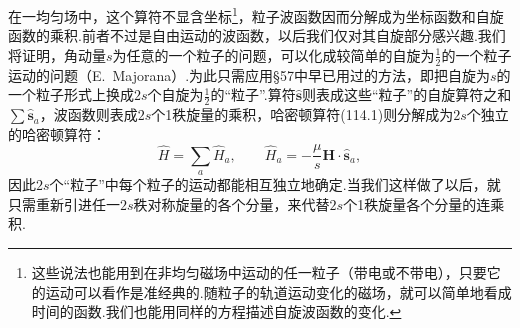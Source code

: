 在一均匀场中，这个算符不显含坐标\footnote{这些说法也能用到在非均匀磁场中运动的任一粒子（带电或不带电），只要它的运动可以看作是准经典的.随粒子的轨道运动变化的磁场，就可以简单地看成时间的函数.我们也能用同样的方程描述自旋波函数的变化.}，粒子波函数因而分解成为坐标函数和自旋函数的乘积.前者不过是自由运动的波函数，以后我们仅对其自旋部分感兴趣.我们将证明，角动量$s$为任意的一个粒子的问题，可以化成较简单的自旋为$\frac{1}{2}$的一个粒子运动的问题（E.~Majorana）.为此只需应用§57中早已用过的方法，即把自旋为$s$的一个粒子形式上换成$2s$个自旋为$\frac{1}{2}$的“粒子”.算符$\hat{\boldsymbol{s}}$则表成这些“粒子”的自旋算符之和$\sum\hat{\boldsymbol{s}}_a$，波函数则表成$2s$个1秩旋量的乘积，哈密顿算符(114.1)则分解成为$2s$个独立的哈密顿算符：
\begin{equation}
  \hat{H}=\sum_a\hat{H}_a,\qquad
  \hat{H}_a=-\frac{\mu}{s}\boldsymbol{H}\cdot\hat{\boldsymbol{s}}_a,
\end{equation}
因此$2s$个“粒子”中每个粒子的运动都能相互独立地确定.当我们这样做了以后，就只需重新引进任一$2s$秩对称旋量的各个分量，来代替$2s$个1秩旋量各个分量的连乘积.


